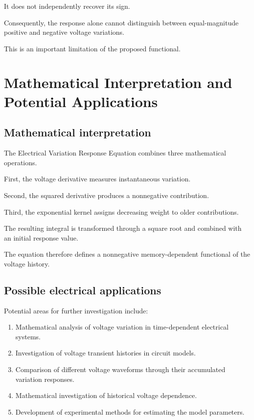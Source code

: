 \documentclass[12pt]{article}
\theoremstyle{definition}
\theoremstyle{remark}
\begin{document}
It does not independently recover its sign.

Consequently, the response alone cannot
distinguish between equal-magnitude
positive and negative voltage variations.

This is an important limitation of the
proposed functional.

\section{Mathematical Interpretation and Potential Applications}

\subsection{Mathematical interpretation}

The Electrical Variation Response Equation
combines three mathematical operations.

First, the voltage derivative measures
instantaneous variation.

Second, the squared derivative produces
a nonnegative contribution.

Third, the exponential kernel assigns
decreasing weight to older contributions.

The resulting integral is transformed
through a square root and combined with
an initial response value.

The equation therefore defines a
nonnegative memory-dependent functional
of the voltage history.

\subsection{Possible electrical applications}

Potential areas for further investigation include:

\begin{enumerate}

    \item Mathematical analysis of voltage
    variation in time-dependent electrical systems.

    \item Investigation of voltage transient
    histories in circuit models.

    \item Comparison of different voltage
    waveforms through their accumulated
    variation responses.

    \item Mathematical investigation of
    historical voltage dependence.

    \item Development of experimental methods
    for estimating the model parameters.

\end{enumerate}
\end{document}

